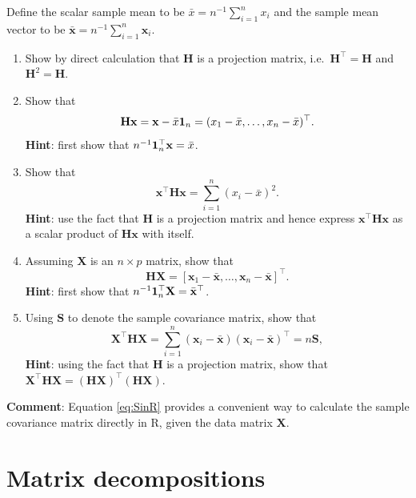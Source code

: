 \documentclass[
]{book}
\theoremstyle{definition}
\theoremstyle{definition}
\theoremstyle{definition}
\theoremstyle{definition}
\theoremstyle{remark}
\begin{document}
\begin{enumerate}
  Define the scalar sample mean to be \(\bar{x}=n^{-1}\sum_{i=1}^n x_i\) and the sample mean vector to be \(\bar{\mathbf x}=n^{-1} \sum_{i=1}^n \mathbf x_i\).

  \begin{enumerate}
  \def\labelenumii{\roman{enumii}.}
  \item
    Show by direct calculation that \(\mathbf H\) is a projection matrix, i.e.~\(\mathbf H^\top = \mathbf H\) and \(\mathbf H^2 =\mathbf H\).
  \item
    Show that
    \[
      \mathbf H\mathbf x= \mathbf x- \bar{x}{\bf 1}_n = (  x_1 - \bar{x}, \ldots , x_n -\bar{x})^\top.
      \]
    \textbf{Hint}: first show that \(n^{-1}{\bf 1}_n^\top \mathbf x=\bar{x}\).
  \item
    Show that
    \[
      \mathbf x^\top \mathbf H\mathbf x= \sum_{i=1}^n (x_i-\bar{x})^2.
      \]
    \textbf{Hint}: use the fact that \(\mathbf H\) is a projection matrix and hence express \(\mathbf x^\top \mathbf H\mathbf x\) as a scalar product of \(\mathbf H\mathbf x\) with itself.
  \item
    Assuming \(\mathbf X\) is an \(n \times p\) matrix, show that
    \[
      \mathbf H\mathbf X=[\mathbf x_1 - \bar{\mathbf x}, \ldots , \mathbf x_n -\bar{\mathbf x}]^\top.
      \]
    \textbf{Hint}: first show that \(n^{-1} {\bf 1}_n^\top \mathbf X=\bar{\mathbf x}^\top\).
  \item
    Using \(\mathbf S\) to denote the sample covariance matrix, show that
    \begin{equation}
      \mathbf X^\top \mathbf H\mathbf X= \sum_{i=1}^n (\mathbf x_i -\bar{\mathbf x})(\mathbf x_i -\bar{\mathbf x})^\top = n\mathbf S,
       \label{eq:SinR}
      \end{equation}
    \textbf{Hint}: using the fact that \(\mathbf H\) is a projection matrix,
    show that
    \(\mathbf X^\top \mathbf H\mathbf X=(\mathbf H\mathbf X)^\top (\mathbf H\mathbf X)\).
  \end{enumerate}

  \textbf{Comment}: Equation \eqref{eq:SinR} provides a convenient way to calculate the sample covariance matrix directly in R, given the data matrix \(\mathbf X\).
\end{enumerate}

\hypertarget{linalg-decomp}{%
\chapter{Matrix decompositions}\label{linalg-decomp}}
\end{document}
